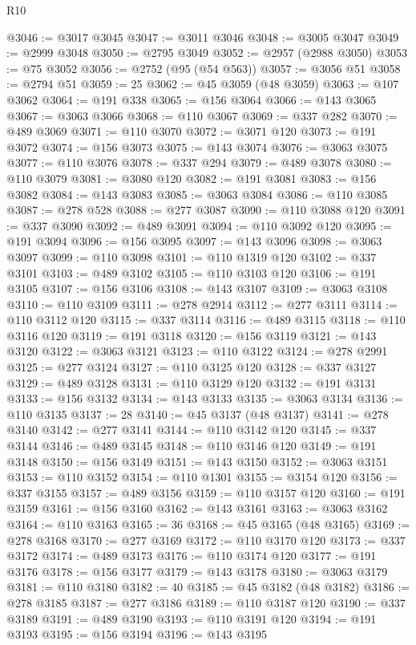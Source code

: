 \begin{lexlean}{R10}
\begin{coremodule}
@3046 := @3017 @3045
@3047 := @3011 @3046
@3048 := @3005 @3047
@3049 := @2999 @3048
@3050 := @2795 @3049
@3052 := @2957 (@2988 @3050)
@3053 := @75 @3052
@3056 := @2752 (@95 (@54 @563))
@3057 := @3056 @51
@3058 := @2794 @51
@3059 := 25
@3062 := @45 @3059 (@48 @3059)
@3063 := @107 @3062
@3064 := @191 @338
@3065 := @156 @3064
@3066 := @143 @3065
@3067 := @3063 @3066
@3068 := @110 @3067
@3069 := @337 @282
@3070 := @489 @3069
@3071 := @110 @3070
@3072 := @3071 @120
@3073 := @191 @3072
@3074 := @156 @3073
@3075 := @143 @3074
@3076 := @3063 @3075
@3077 := @110 @3076
@3078 := @337 @294
@3079 := @489 @3078
@3080 := @110 @3079
@3081 := @3080 @120
@3082 := @191 @3081
@3083 := @156 @3082
@3084 := @143 @3083
@3085 := @3063 @3084
@3086 := @110 @3085
@3087 := @278 @528
@3088 := @277 @3087
@3090 := @110 @3088 @120
@3091 := @337 @3090
@3092 := @489 @3091
@3094 := @110 @3092 @120
@3095 := @191 @3094
@3096 := @156 @3095
@3097 := @143 @3096
@3098 := @3063 @3097
@3099 := @110 @3098
@3101 := @110 @1319 @120
@3102 := @337 @3101
@3103 := @489 @3102
@3105 := @110 @3103 @120
@3106 := @191 @3105
@3107 := @156 @3106
@3108 := @143 @3107
@3109 := @3063 @3108
@3110 := @110 @3109
@3111 := @278 @2914
@3112 := @277 @3111
@3114 := @110 @3112 @120
@3115 := @337 @3114
@3116 := @489 @3115
@3118 := @110 @3116 @120
@3119 := @191 @3118
@3120 := @156 @3119
@3121 := @143 @3120
@3122 := @3063 @3121
@3123 := @110 @3122
@3124 := @278 @2991
@3125 := @277 @3124
@3127 := @110 @3125 @120
@3128 := @337 @3127
@3129 := @489 @3128
@3131 := @110 @3129 @120
@3132 := @191 @3131
@3133 := @156 @3132
@3134 := @143 @3133
@3135 := @3063 @3134
@3136 := @110 @3135
@3137 := 28
@3140 := @45 @3137 (@48 @3137)
@3141 := @278 @3140
@3142 := @277 @3141
@3144 := @110 @3142 @120
@3145 := @337 @3144
@3146 := @489 @3145
@3148 := @110 @3146 @120
@3149 := @191 @3148
@3150 := @156 @3149
@3151 := @143 @3150
@3152 := @3063 @3151
@3153 := @110 @3152
@3154 := @110 @1301
@3155 := @3154 @120
@3156 := @337 @3155
@3157 := @489 @3156
@3159 := @110 @3157 @120
@3160 := @191 @3159
@3161 := @156 @3160
@3162 := @143 @3161
@3163 := @3063 @3162
@3164 := @110 @3163
@3165 := 36
@3168 := @45 @3165 (@48 @3165)
@3169 := @278 @3168
@3170 := @277 @3169
@3172 := @110 @3170 @120
@3173 := @337 @3172
@3174 := @489 @3173
@3176 := @110 @3174 @120
@3177 := @191 @3176
@3178 := @156 @3177
@3179 := @143 @3178
@3180 := @3063 @3179
@3181 := @110 @3180
@3182 := 40
@3185 := @45 @3182 (@48 @3182)
@3186 := @278 @3185
@3187 := @277 @3186
@3189 := @110 @3187 @120
@3190 := @337 @3189
@3191 := @489 @3190
@3193 := @110 @3191 @120
@3194 := @191 @3193
@3195 := @156 @3194
@3196 := @143 @3195

\end{coremodule}
\end{lexlean}
